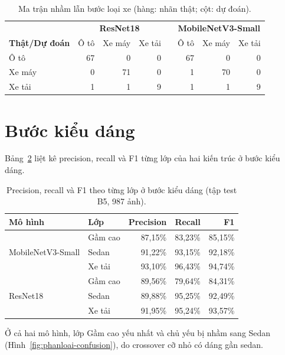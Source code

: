 \begin{table}[htbp]
\centering
\caption{Ma trận nhầm lẫn bước loại xe (hàng: nhãn thật; cột: dự đoán).}
\label{tab:app-type-cm}

\vspace{4pt}
\begin{tabular}{@{}lrrrcrrr@{}}
\toprule
& \multicolumn{3}{c}{\textbf{ResNet18}} & & \multicolumn{3}{c}{\textbf{MobileNetV3-Small}} \\
\textbf{Thật/Dự đoán} & Ô tô & Xe máy & Xe tải & & Ô tô & Xe máy & Xe tải \\
\midrule
Ô tô   & 67 & 0  & 0 & & 67 & 0  & 0 \\
Xe máy & 0  & 71 & 0 & & 1  & 70 & 0 \\
Xe tải & 1  & 1  & 9 & & 1  & 1  & 9 \\
\bottomrule
\end{tabular}
\end{table}

\section{Bước kiểu dáng}

Bảng~\ref{tab:app-style-perclass} liệt kê precision, recall và F1 từng lớp của hai kiến trúc ở bước kiểu dáng.

\begin{table}[htbp]
\centering
\caption{Precision, recall và F1 theo từng lớp ở bước kiểu dáng (tập test B5, 987 ảnh).}
\label{tab:app-style-perclass}

\vspace{4pt}
\begin{tabular}{@{}llrrr@{}}
\toprule
\textbf{Mô hình} & \textbf{Lớp} & \textbf{Precision} & \textbf{Recall} & \textbf{F1} \\
\midrule
\multirow{3}{*}{MobileNetV3-Small}
 & Gầm cao & 87,15\% & 83,23\% & 85,15\% \\
 & Sedan   & 91,22\% & 93,15\% & 92,18\% \\
 & Xe tải  & 93,10\% & 96,43\% & 94,74\% \\
\midrule
\multirow{3}{*}{ResNet18}
 & Gầm cao & 89,56\% & 79,64\% & 84,31\% \\
 & Sedan   & 89,88\% & 95,25\% & 92,49\% \\
 & Xe tải  & 91,95\% & 95,24\% & 93,57\% \\
\bottomrule
\end{tabular}
\end{table}

Ở cả hai mô hình, lớp Gầm cao yếu nhất và chủ yếu bị nhầm sang Sedan (Hình~\ref{fig:phanloai-confusion}), do crossover cỡ nhỏ có dáng gần sedan.
